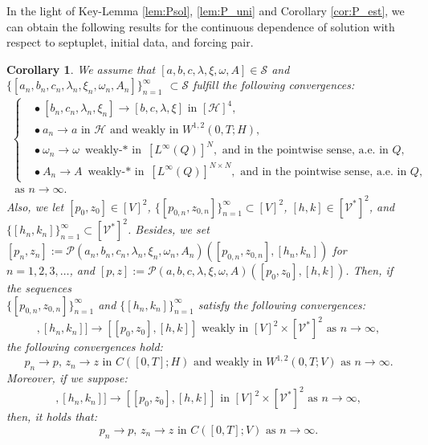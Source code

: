 \documentclass{sinst}
\numberwithin{equation}{section}
\theoremstyle{plain}
\newtheorem{cor}{Corollary}%
\theoremstyle{definition}
\def\sH{\mathscr{H}}
\def\sP{\mathscr{P}}
\def\sS{\mathscr{S}}
\def\sV{\mathscr{V}}
\begin{document}
In the light of Key-Lemma \ref{lem:Psol}, \ref{lem:P_uni} and Corollary \ref{cor:P_est}, we can obtain the following results for the continuous dependence of solution with respect to septuplet, initial data, and forcing pair.

\begin{cor}\label{cor:CD}
  We assume that $[a, b, c, \lambda, \xi, \omega, A] \in \sS$ and $\{ [a_n, b_n, c_n, \lambda_n, \xi_n, \omega_n, A_n] \}_{n=1}^\infty$ $\subset \sS$ fulfill the following convergences:
  \begin{gather}
    \left\{ \begin{aligned}
      &\bullet \ [b_n,c_n,\lambda_n,\xi_n] \to [b,c,\lambda,\xi] \mbox{ in } [\sH]^4,
      \\
      &\bullet \ a_n \to a \mbox{ in } \sH \mbox{ and weakly in } W^{1,2}(0,T;H),
      \\
      &\bullet \ \omega_n \to \omega \mbox{ weakly-$*$ in } [L^\infty(Q)]^N, \mbox{ and in the pointwise sense, a.e. in } Q,
      \\
      &\bullet \ A_n \to A \mbox{ weakly-$*$ in } [L^\infty(Q)]^{N \times N}, \mbox{ and in the pointwise sense, a.e. in } Q,
    \end{aligned} \right. \label{CD_01}
    \\
    \mbox{ as } n \to \infty.
  \end{gather} 
  Also, we let $[p_0,z_0] \in [V]^2$, $\{ [p_{0,n}, z_{0,n}] \}_{n=1}^\infty \subset [V]^2$, $[h,k] \in [\sV^*]^2$, and $\{ [h_n, k_n] \}_{n=1}^\infty \subset [\sV^*]^2$. Besides, we set $[p_n, z_n] := \sP(a_n, b_n, c_n, \lambda_n, \xi_n, \omega_n, A_n)([p_{0,n}, z_{0,n}], [h_n,k_n])$ for $n = 1,2,3,\dots$, and $[p,z] := \sP(a, b, c, \lambda, \xi, \omega, A)([p_0,z_0],[h,k])$. Then, if the sequences 
  \\
  $\{ [p_{0,n},z_{0,n}] \}_{n=1}^\infty$ and $\{ [h_n,k_n] \}_{n=1}^\infty$ satisfy the following convergences:
  \begin{equation}
    [[p_{0,n},z_{0,n}], [h_n,k_n]] \to [[p_0,z_0], [h,k]] \mbox{ weakly in } [V]^2 \times [\sV^*]^2 \mbox{ as } n \to \infty, \label{CD_02_0}
  \end{equation}
  the following convergences hold:
  \begin{equation}
    p_n \to p, \, z_n \to z \mbox{ in } C([0,T];H) \mbox{ and weakly in } W^{1,2}(0,T;V) \mbox{ as } n \to \infty. \label{CD_02}
  \end{equation}
  Moreover, if we suppose:
  \begin{equation}
    [[p_{0,n},z_{0,n}], [h_n,k_n]] \to [[p_0,z_0], [h,k]] \mbox{ in } [V]^2 \times [\sV^*]^2 \mbox{ as } n \to \infty, \label{CD_03_0}
  \end{equation}
  then, it holds that:
  \begin{equation}
    p_n \to p, \, z_n \to z \mbox{ in } C([0,T];V) \mbox{ as } n \to \infty. \label{CD_03}
  \end{equation}
\end{cor}
\end{document}
